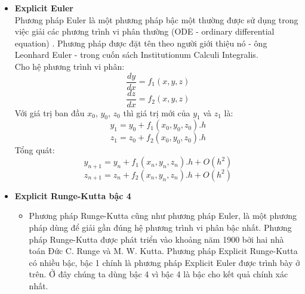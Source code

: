 \documentclass[a4paper]{article}
\begin{document}
\begin{itemize}

\item \textbf{Explicit Euler \\} 
Phương pháp Euler là một phương pháp bậc một thường được sử dụng trong việc giải các phương trình vi phân thường (ODE - ordinary differential equation) . Phương pháp được đặt tên theo người giới thiệu nó - ông Leonhard Euler - trong cuốn sách Institutionum Calculi Integralis. \\
Cho hệ phương trình vi phân: 
    \[\frac{dy}{dx} = f_1(x,y,z)\]
    \[\frac{dz}{dx} = f_2(x,y,z)\]
Với giá trị ban đầu $x_0$, $y_0$, $z_0$ thì giá trị mới của $y_1$ và $z_1$ là:
    \[y_1 = y_0 + f_1(x_0,y_0,z_0).h\]
    \[z_1 = z_0 + f_2(x_0,y_0,z_0).h\]
    Tổng quát:\\
    \[y_{n+1} = y_n + f_1(x_n,y_n,z_n).h + O(h^2)\]
    \[z_{n+1} = z_n + f_2(x_n,y_n,z_n).h + O(h^2)\]
    
\item \textbf{Explicit Runge-Kutta bậc 4 \\}
\begin{itemize}
    \item Phương pháp Runge-Kutta cũng như phương pháp Euler, là một phương pháp dùng để giải gần đúng hệ phương trình vi phân bậc nhất. Phương pháp Runge-Kutta được phát triển vào khoảng năm 1900 bởi hai nhà toán Đức C. Runge và M. W. Kutta. Phương pháp Explicit Runge-Kutta có nhiều bậc, bậc 1 chính là phương pháp Explicit Euler được trình bày ở trên. Ở đây chúng ta dùng bậc 4 vì bậc 4 là bậc cho kết quả chính xác nhất. \\
\end{itemize}


\end{itemize}
\end{document}
